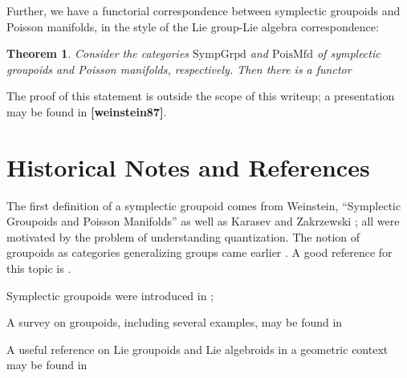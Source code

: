 \documentclass{tufte-handout}
\newtheorem{thrm}{Theorem}
\begin{document}
Further, we have a functorial correspondence between symplectic groupoids and Poisson manifolds, in the style of the Lie group-Lie algebra correspondence:
\begin{thrm}
Consider the categories $\mathrm{SympGrpd}$ and $\mathrm{PoisMfd}$ of symplectic groupoids and Poisson manifolds, respectively. Then there is a functor


\end{thrm}
The proof of this statement is outside the scope of this writeup; a presentation may be found in \textbf{[weinstein87]}.

\section{Historical Notes and References}
The first definition of a symplectic groupoid comes from Weinstein, ``Symplectic Groupoids and Poisson Manifolds'' \cite{weinstein87} as well as Karasev \cite{} and Zakrzewski \cite{}; all were motivated by the problem of understanding quantization. The notion of groupoids as categories generalizing groups came earlier \cite{SOMETHING HERE}. A good reference for this topic is \cite{}. %

Symplectic groupoids were introduced in \cite{weinstein87}; %

A survey on groupoids, including several examples, may be found in \cite{weinstein1996} %

A useful reference on Lie groupoids and Lie algebroids in a geometric context may be found in \cite{mackenzie1987}


\end{document}
